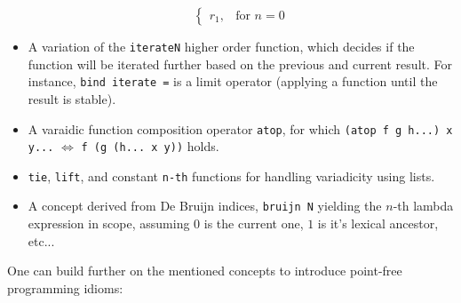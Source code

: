 \begin{itemize}
\[\begin{cases}
            r_1, & \text{for } n = 0
          \end{cases}
    \]
    \item A variation of the \verb|iterateN| higher order function, which decides if the function will be iterated further based on the previous and current result. For instance, \verb|bind iterate =| is a limit operator (applying a function until the result is stable).
    \item A varaidic function composition operator \verb|atop|, for which \verb|(atop f g h...) x y...| $\Leftrightarrow$ \verb|f (g (h... x y))| holds.
    \item \verb|tie|, \verb|lift|, and constant \verb|n-th| functions for handling variadicity using lists.
    \item A concept derived from De Bruijn indices, \verb|bruijn N| yielding the $n$-th lambda expression in scope, assuming $0$ is the current one, $1$ is it's lexical ancestor, etc...
\end{itemize}

One can build further on the mentioned concepts to introduce point-free programming idioms:

